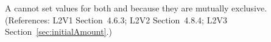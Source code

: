 A \Species cannot set values for both  and
 because they are mutually exclusive.  (References:
L2V1 Section~4.6.3; L2V2 Section~4.8.4; L2V3 Section~\ref{sec:initialAmount}.)
